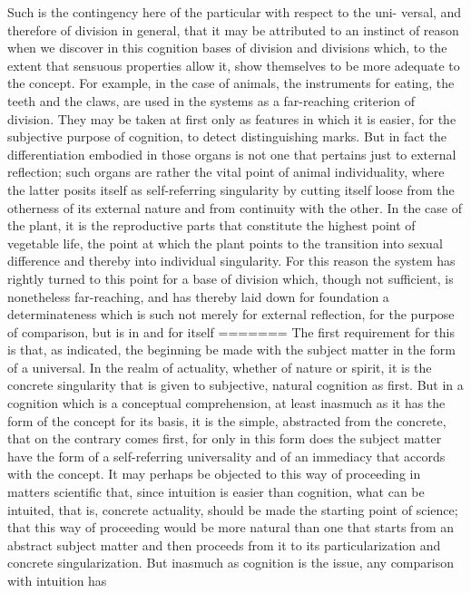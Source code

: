 Such is the contingency here of the particular with respect to the uni-
versal, and therefore of division in general, that it may be attributed to
an instinct of reason when we discover in this cognition bases of division
and divisions which, to the extent that sensuous properties allow it, show
themselves to be more adequate to the concept. For example, in the case
of animals, the instruments for eating, the teeth and the claws, are used
in the systems as a far-reaching criterion of division. They may be taken
at first only as features in which it is easier, for the subjective purpose of
cognition, to detect distinguishing marks. But in fact the differentiation
embodied in those organs is not one that pertains just to external reflection;
such organs are rather the vital point of animal individuality, where the
latter posits itself as self-referring singularity by cutting itself loose from
the otherness of its external nature and from continuity with the other.
In the case of the plant, it is the reproductive parts that constitute the
highest point of vegetable life, the point at which the plant points to the
transition into sexual difference and thereby into individual singularity. For
this reason the system has rightly turned to this point for a base of division
which, though not sufficient, is nonetheless far-reaching, and has thereby
laid down for foundation a determinateness which is such not merely for
external reflection, for the purpose of comparison, but is in and for itself
=======
The first requirement for this is that, as indicated,
the beginning be made with the subject matter
in the form of a universal.
In the realm of actuality,
whether of nature or spirit,
it is the concrete singularity that is given to
subjective, natural cognition as first.
But in a cognition which is a conceptual comprehension,
at least inasmuch as it has
the form of the concept for its basis,
it is the simple, abstracted from the concrete,
that on the contrary comes first,
for only in this form does the subject matter have
the form of a self-referring universality
and of an immediacy that accords with the concept.
It may perhaps be objected to
this way of proceeding in matters scientific
that, since intuition is easier than cognition,
what can be intuited, that is, concrete actuality,
should be made the starting point of science;
that this way of proceeding would be more natural
than one that starts from an abstract subject matter
and then proceeds from it to its
particularization and concrete singularization.
But inasmuch as cognition is the issue,
any comparison with intuition has
